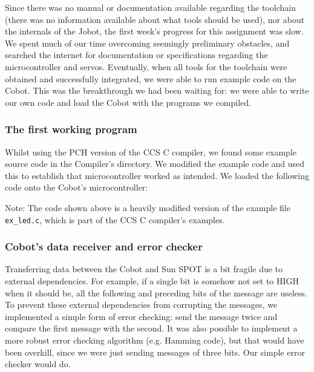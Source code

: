 \documentclass[a4paper,10pt]{article} %
\begin{document}
Since there was no manual or documentation available regarding the toolchain
(there was no information available about what tools should be used), nor about
the internals of the Jobot, the first week's progress for this assignment was
slow. We spent much of our time overcoming seemingly preliminary obstacles, and
searched the internet for documentation or specifications regarding the
microcontroller and servos.  Eventually, when all tools for the toolchain were
obtained and successfully integrated, we were able to run example code on the
Cobot. This was the breakthrough we had been waiting for: we were able to write
our own code and load the Cobot with the programs we compiled.

\subsubsection{The first working program} %
\label{ssub:The first working example source code}

Whilst using the PCH version of the CCS C compiler, we found some example
source code in the Compiler's directory. We modified the example code
and used this to establish that microcontroller worked as intended. We loaded the following code onto the Cobot's microcontroller:



\noindent Note: The code shown above is a heavily modified version of the
example file \texttt{ex\_led.c}, which is part of the CCS C compiler's examples.


\subsubsection{Cobot's data receiver and error checker} %
\label{ssub:Cobot's data receiver and error checker}

Transferring data between the Cobot and Sun SPOT is a bit fragile due to
external dependencies. For example, if a single bit is somehow not set to HIGH
when it should be, all the following and preceding bits of the message are
useless. To prevent these external dependencies from corrupting the messages, we
implemented a simple form of error checking: send the message twice and compare
the first message with the second. It was also possible to implement a more
robust error checking algorithm (e.g. Hamming code), but that would have been
overkill, since we were just sending messages of three bits. Our simple error
checker would do.
\end{document}

